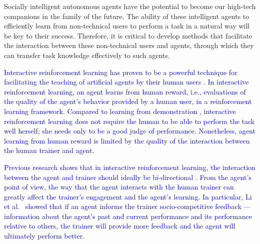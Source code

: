 Socially intelligent autonomous agents have the potential to become our high-tech companions in the family of the future. The ability of these intelligent agents to efficiently learn from non-technical users to perform a task in a natural way will be key to their success. Therefore, it is critical to develop methods that facilitate the interaction between these non-technical users and agents, through which they can transfer task knowledge effectively to such agents.

\textcolor{blue}{Interactive reinforcement learning %
has proven to be a powerful technique for facilitating the teaching of artificial agents by their human users \cite{isbell2001social,thomaz2008teachable,knox2009interactively}. In interactive reinforcement learning, an agent learns from human reward, i.e., evaluations of the quality of the agent's behavior provided by a human user, in a reinforcement learning framework.
Compared to learning from demonstration \cite{argall2009survey}, %
interactive reinforcement learning does not require the human to be able to perform the task well herself; she needs only to be a good judge of performance.  Nonetheless, agent learning from human reward is limited by the quality of the interaction between the human trainer and agent.} %

\textcolor{blue}{Previous research shows that in interactive reinforcement learning, the interaction between the agent and trainer should ideally be bi-directional \cite{li2013using}. %
From the agent's point of view, the way that the agent interacts with the human trainer can greatly affect the trainer's engagement and the agent's learning. In particular, Li et al.\ \cite{li2016using,li2017social} showed that if an agent informs the trainer socio-competitive feedback --- information about the agent's past and current performance and its performance relative to others, the trainer will provide more feedback and the agent will ultimately perform better. }

